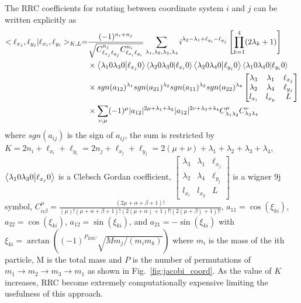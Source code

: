 The RRC coefficients for rotating between coordinate system $i$ and $j$ can be written explicitly as
\begin{align}
\nonumber
    <\ell_{x_j},\ell_{y_j}|\ell_{x_i},\ell_{y_i}>_{K,L} =& \frac{(-1)^{n_i+n_j}}{\sqrt{C_{\ell_{x_j}\ell_{y_j}}^{n_j}C_{\ell_{x_i}\ell_{y_i}}^{n_i}}} \sum\limits_{\lambda_1,\lambda_2,\lambda_3,\lambda_4} i^{\lambda_2-\lambda_1+\ell_{y_i}-\ell_{y_j}}\left[\prod_{k=1}^4 (2\lambda_k +1)\right] \\ 
\nonumber
    & \times \braket{\lambda_1 0 \lambda_3 0}{\ell_{x_j} 0} \braket{\lambda_2 0 \lambda_3 0}{\ell_{x_i} 0} \braket{\lambda_2 0 \lambda_4 0}{\ell_{y_j} 0} \braket{\lambda_1 0 \lambda_4 0}{\ell_{y_i} 0} \\
\nonumber
    & \times sgn(a_{12})^{\lambda_1}sgn(a_{21})^{\lambda_2}sgn(a_{11})^{\lambda_3}sgn(a_{22})^{\lambda_4} \begin{bmatrix}
   \lambda_3 & \lambda_1 & \ell_{x_j} \\
   \lambda_2 & \lambda_4 & \ell_{y_j} \\
   l_{x_i}   & l_{x_y}   & L
   \end{bmatrix} \\
    & \times \sum\limits_{\nu,\mu} (-1)^{\mu}|a_{12}|^{2\mu + \lambda_1 + \lambda_2} |a_{12}|^{2\nu + \lambda_3 + \lambda_4} C_{\lambda_1 \lambda_2}^{\mu} C_{\lambda_3 \lambda_4}^{\nu}
    \label{eq:RRC}
\end{align}
where $sgn(a_{ij})$ is the sign of $a_{ij}$, the sum is restricted by $K=2n_i+\ell_{x_i}+\ell_{y_i}=2n_j+\ell_{x_j}+\ell_{y_j}=2(\mu+\nu)+\lambda_1+\lambda_2+\lambda_3+\lambda_4$, $\braket{\lambda_1 0 \lambda_3 0}{\ell_{x_j} 0}$ is a Clebsch Gordan coefficient,
     $\begin{bmatrix}
        \lambda_3 & \lambda_1 & \ell_{x_j} \\
        \lambda_2 & \lambda_4 & \ell_{y_j} \\
        l_{x_i}   & l_{x_y}   & L
        \end{bmatrix}$
is a wigner 9j symbol, 
    $C_{\alpha\beta}^\mu = \frac{(2\mu+\alpha+\beta+1)!}{(\mu)!(\mu+\alpha+\beta+1)!(2(\mu+\alpha)+1)!!(2(\mu+\beta)+1)!!}$,
$a_{11} = \cos(\xi_{ki})$,
$a_{22} = \cos(\xi_{ki})$,
$a_{12} = \sin(\xi_{ki})$, and 
$a_{21} = -\sin(\xi_{ki})$
with $\xi_{ki} = \arctan((-1)^{P_{RRC}}\sqrt{Mm_j/(m_i m_k)})$ where $m_i$ is the mass of the ith particle, M is the total mass and $P$ is the number of permutations of $m_1\rightarrow m_2\rightarrow m_3\rightarrow m_1$  as shown in Fig.~\ref{fig:jacobi_coord}. As the value of $K$ increases, RRC become extremely computationally expensive limiting the usefulness of this approach.


